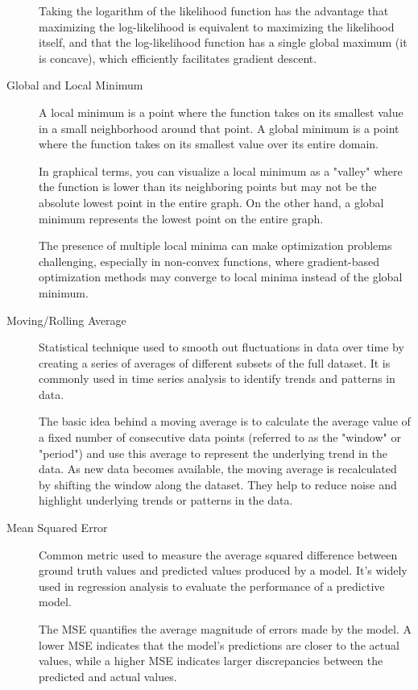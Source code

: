 \documentclass[a4paper]{article}
\begin{document}
\begin{description}
Taking the logarithm of the likelihood function has the advantage that maximizing the log-likelihood is equivalent to maximizing the likelihood itself, and that the log-likelihood function has a single global maximum (it is concave), which efficiently facilitates gradient descent.

\item[Global and Local Minimum]
A local minimum is a point where the function takes on its smallest value in a small neighborhood around that point. A global minimum is a point where the function takes on its smallest value over its entire domain. 

In graphical terms, you can visualize a local minimum as a "valley" where the function is lower than its neighboring points but may not be the absolute lowest point in the entire graph. On the other hand, a global minimum represents the lowest point on the entire graph.

The presence of multiple local minima can make optimization problems challenging, especially in non-convex functions, where gradient-based optimization methods may converge to local minima instead of the global minimum.

\item[Moving/Rolling Average]
Statistical technique used to smooth out fluctuations in data over time by creating a series of averages of different subsets of the full dataset. It is commonly used in time series analysis to identify trends and patterns in data. 

The basic idea behind a moving average is to calculate the average value of a fixed number of consecutive data points (referred to as the "window" or "period") and use this average to represent the underlying trend in the data. As new data becomes available, the moving average is recalculated by shifting the window along the dataset. They help to reduce noise and highlight underlying trends or patterns in the data. 

\item[Mean Squared Error]
Common metric used to measure the average squared difference between ground truth values and predicted values produced by a model. It's widely used in regression analysis to evaluate the performance of a predictive model.

The MSE quantifies the average magnitude of errors made by the model. A lower MSE indicates that the model's predictions are closer to the actual values, while a higher MSE indicates larger discrepancies between the predicted and actual values.


\end{description}
\end{document}

